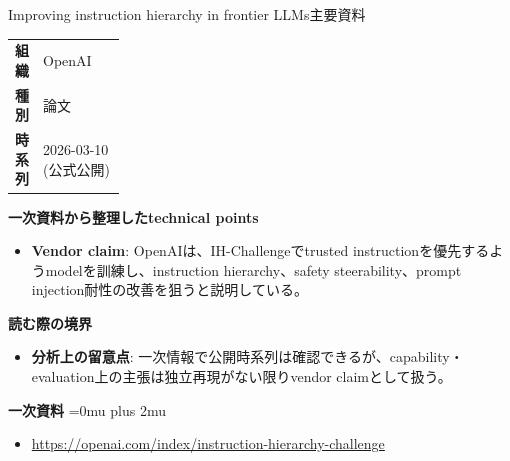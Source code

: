 \begin{technicalnote}{Improving instruction hierarchy in frontier LLMs}{主要資料}
\begingroup
\begin{tabularx}{\linewidth}{@{}>{\bfseries}p{0.22\linewidth}X@{}}
組織 & OpenAI \\
種別 & 論文 \\
時系列 & 2026-03-10 (公式公開) \\
\end{tabularx}
\smallskip
{\bfseries 一次資料から整理したtechnical points}
\begin{itemize}[leftmargin=1.5em,itemsep=0.35em]
\item \textbf{Vendor claim}: OpenAIは、IH-Challengeでtrusted instructionを優先するようmodelを訓練し、instruction hierarchy、safety steerability、prompt injection耐性の改善を狙うと説明している。
\end{itemize}
\begin{minipage}{\linewidth}
{\bfseries 読む際の境界}
\begin{itemize}[leftmargin=1.5em,itemsep=0.35em]
\item \textbf{分析上の留意点}: 一次情報で公開時系列は確認できるが、capability・evaluation上の主張は独立再現がない限りvendor claimとして扱う。
\end{itemize}
\begin{samepage}
{\bfseries 一次資料}
\begingroup\sloppy
\Urlmuskip=0mu plus 2mu\relax
\begin{itemize}[leftmargin=1.5em,itemsep=0.25em]
\item {\scriptsize\url{https://openai.com/index/instruction-hierarchy-challenge}}
\end{itemize}
\endgroup
\end{samepage}
\end{minipage}
\endgroup
\end{technicalnote}
\medskip

